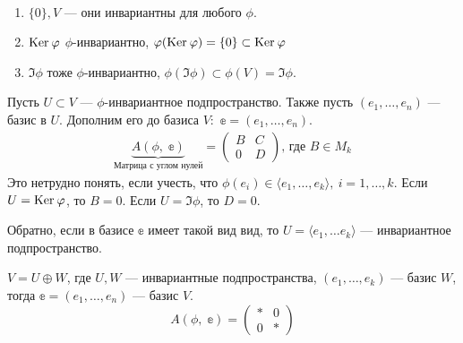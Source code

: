 \begin{Examples}
    \ 
    \begin{enumerate}
        \item $\{0\}, V$ --- они инвариантны для любого $\phi$.
        \item $\mathrm{Ker}\:\varphi$ $\phi$-инвариантно, $\varphi(\mathrm{Ker}\:\varphi) = \{0\} \subset \mathrm{Ker}\:\varphi$
        \item $\Im\phi$ тоже $\phi$-инвариантно, $\phi(\Im\phi)\subset \phi(V) = \Im \phi$.
    \end{enumerate}
\end{Examples}
Пусть $U\subset V$ --- $\phi$-инвариантное подпространство. Также пусть $(e_1, \ldots, e_n)$ --- базис в $U$. Дополним его до базиса $V\colon$ $\mathbb{e} = (e_1, \ldots, e_n)$. 
\begin{gather}
    \underbrace{A(\phi,\;\mathbb{e})}_{\text{Матрица с углом нулей}} = \begin{pmatrix}
    B& C \\
    0& D
    \end{pmatrix}\text{,  где $B\in M_k$}
\end{gather}
Это нетрудно понять, если учесть, что $\phi(e_i)\in \langle e_1, \ldots, e_k\rangle,\ i=1,\dots, k$.
Если $U = \mathrm{Ker}\: \varphi$, то $B = 0$. Если $U = \Im \phi$, то $D = 0$. 
\par Обратно, если в базисе $\mathbb{e}$ имеет такой вид вид, то $U = \langle e_1, \ldots e_k\rangle$ --- инвариантное подпространство. 
\begin{Generalization}
    $V = U \oplus W$, где $U, W$ --- инвариантные подпространства, $(e_1, \ldots, e_k)$ --- базис $W$, тогда $\mathbb{e} = (e_1, \dots, e_n)$ --- базис $V$.
    \[  
        A(\phi,\; \mathbb{e}) = \begin{pmatrix}
            *& 0 \\
            0& *
        \end{pmatrix}
    \]
\end{Generalization}
